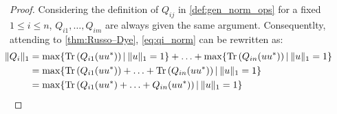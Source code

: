 \begin{proof}
  Considering the definition of $Q_{ij}$ in \autoref{def:gen_norm_ops} for a fixed $1 \leq i \leq n$, $Q_{i1}, \ldots, Q_{im}$ are always given the same argument.
  Consequentlty, attending to \autoref{thm:Russo–Dye}, \autoref{eq:qi_norm} can be rewritten as:
  \begin{align} 
    \hspace{-30pt} \lVert Q_i \rVert_{1} & = \max \{\text{Tr}\left(Q_{i1}(uu^{*}) \right) \vert \hspace{2pt}  \lVert u \rVert_{1}=1 \} + \ldots +  \max \{\text{Tr}\left(Q_{in}(u u^{*}) \right) \vert \hspace{2pt}  \lVert u \rVert_{1}=1 \}\\ \label{eq:qi_ptp_norm_1}
    \hspace{-30pt} & =  \max \{ \text{Tr}\left(Q_{i1}(uu^{*}) \right) + \ldots + \text{Tr}\left(Q_{in}(u u^{*}) \right) \vert \hspace{2pt}  \lVert u \rVert_{1}=1 \} \\
    \hspace{-30pt} & =  \max \{ \text{Tr}\left(Q_{i1}(uu^{*}) + \ldots + Q_{in}(u u^{*}) \right) \vert \hspace{2pt}  \lVert u \rVert_{1}=1 \}  \label{eq:qi_ptp_norm_3}
  \end{align}

\end{proof}
